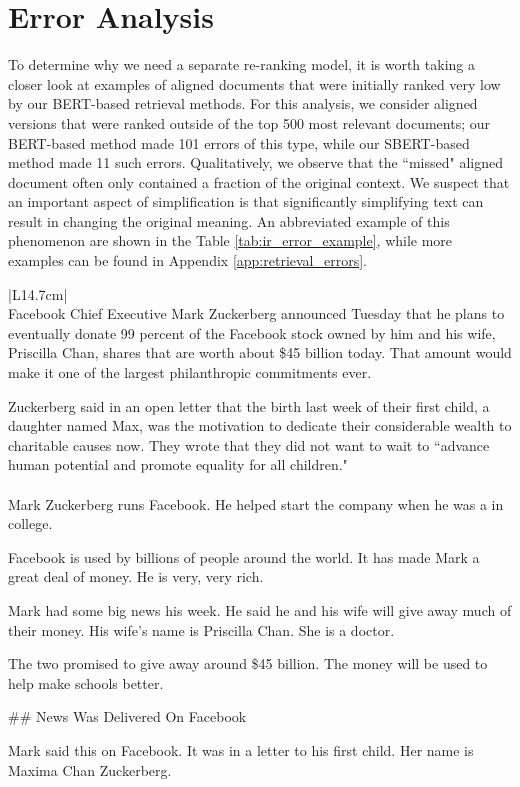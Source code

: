 \documentclass[thesis.tex]{subfiles}
\begin{document}
\section{Error Analysis}

To determine why we need a separate re-ranking model, it is worth taking a closer look at examples of aligned documents that were initially ranked very low by our BERT-based retrieval methods. For this analysis, we consider aligned versions that were ranked outside of the top 500 most relevant documents; our BERT-based method made 101 errors of this type, while our SBERT-based method made 11 such errors. Qualitatively, we observe that the ``missed" aligned document often only contained a fraction of the original context. We suspect that an important aspect of simplification is that significantly simplifying text can result in changing the original meaning. An abbreviated example of this phenomenon are shown in the Table \ref{tab:ir_error_example}, while more examples can be found in Appendix \ref{app:retrieval_errors}.

\begin{table}
\begin{center}
\begin{tabular}{|L{14.7cm}|}\hline
{} \\ \hline
\scriptsize Facebook Chief Executive Mark Zuckerberg announced Tuesday that he plans to eventually donate 99 percent of the Facebook stock owned by him and his wife, Priscilla Chan, shares that are worth about \$45 billion today. That amount would make it one of the largest philanthropic commitments ever.

Zuckerberg said in an open letter that the birth last week of their first child, a daughter named Max, was the motivation to dedicate their considerable wealth to charitable causes now. They wrote that they did not want to wait to ``advance human potential and promote equality for all children." \\ \hline \hline
{} \\ \hline 
\scriptsize Mark Zuckerberg runs Facebook. He helped start the company when he was a in college.

Facebook is used by billions of people around the world. It has made Mark a great deal of money. He is very, very rich.

Mark had some big news his week. He said he and his wife will give away much of their money. His wife's name is Priscilla Chan. She is a doctor.

The two promised to give away around \$45 billion. The money will be used to help make schools better.

\#\# News Was Delivered On Facebook

Mark said this on Facebook. It was in a letter to his first child. Her name is Maxima Chan Zuckerberg. \\ \hline
\end{tabular}
\end{center}
\caption{\label{tab:ir_error_example} Example of an aligned document pair missed by our BERT-based model, titled \textit{zuckerberg-donation}.}
\end{table}
\end{document}
